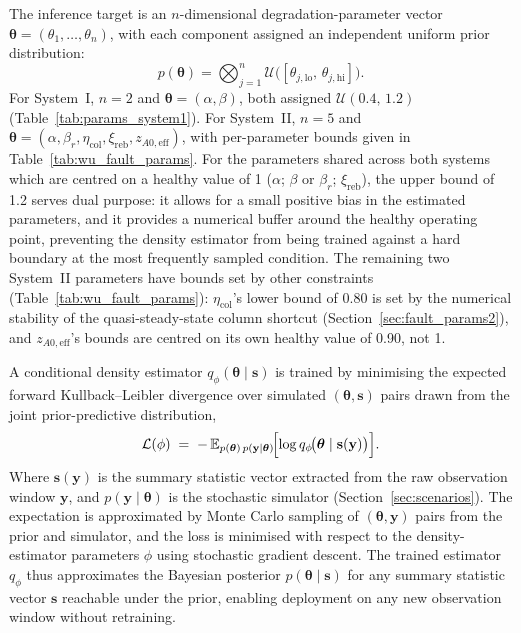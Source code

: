 \documentclass[aps,pre,twocolumn,superscriptaddress]{revtex4-2}
\begin{document}
The inference target is an $n$-dimensional degradation-parameter vector $\boldsymbol{\theta}=(\theta_1,\ldots,\theta_n)$, with each component
assigned an independent uniform prior distribution:
%
\begin{equation}
  p(\boldsymbol{\theta}) =
  \bigotimes_{j=1}^{n}
  \mathcal{U}\!\bigl([\theta_{j,\mathrm{lo}},\,\theta_{j,\mathrm{hi}}]\bigr).
  \label{eq:prior}
\end{equation}
%
For System~I, $n=2$ and $\boldsymbol{\theta}=(\alpha,\beta)$, both assigned
$\mathcal{U}(0.4,\,1.2)$ (Table~\ref{tab:params_system1}). For System~II,
$n=5$ and
$\boldsymbol{\theta}=(\alpha,\beta_r,\eta_\mathrm{col},\xi_\mathrm{reb},z_{A0,\mathrm{eff}})$,
with per-parameter bounds given in Table~\ref{tab:wu_fault_params}.
For the parameters shared across both systems which are centred on a healthy value of 1 ($\alpha$; $\beta$ or $\beta_r$; $\xi_\mathrm{reb}$), the upper bound of 1.2 serves dual purpose: it allows for a small positive bias in the estimated parameters, and it provides a numerical buffer around the healthy operating point, preventing the density estimator from being trained against a hard boundary at the most frequently sampled condition. The remaining two System~II parameters have bounds set by other constraints (Table~\ref{tab:wu_fault_params}): $\eta_\mathrm{col}$'s lower bound of 0.80 is set by the numerical stability of the quasi-steady-state column shortcut (Section~\ref{sec:fault_params2}), and $z_{A0,\mathrm{eff}}$'s bounds are centred on its own healthy value of 0.90, not 1.

A conditional density estimator $q_\phi(\boldsymbol{\theta}\mid\mathbf{s})$ is trained by minimising the expected forward Kullback--Leibler divergence over simulated $(\boldsymbol{\theta},\mathbf{s})$ pairs drawn from the joint prior-predictive distribution,
%
\begin{equation}
  \mathcal{L}(\phi)
  \;=\;
  -\,\mathbb{E}_{p(\boldsymbol{\theta})\,p(\mathbf{y}\mid\boldsymbol{\theta})}
  \!\Bigl[
    \log q_\phi\!\bigl(\boldsymbol{\theta}\mid\mathbf{s}(\mathbf{y})\bigr)
  \Bigr].
  \label{eq:snpe_loss}
\end{equation}
%
Where $\mathbf{s}(\mathbf{y})$ is the summary statistic vector extracted from the raw observation window $\mathbf{y}$, and $p(\mathbf{y}\mid\boldsymbol{\theta})$ 
is the stochastic simulator (Section~\ref{sec:scenarios}). The expectation is approximated by Monte Carlo sampling of $(\boldsymbol{\theta},\mathbf{y})$ pairs from the prior and simulator, and the loss is minimised with respect to the density-estimator parameters $\phi$ using stochastic gradient descent. The trained estimator $q_\phi$ thus approximates the Bayesian posterior $p(\boldsymbol{\theta}\mid\mathbf{s})$ for any summary statistic vector $\mathbf{s}$ reachable under the prior, enabling
deployment on any new observation window without retraining.
\end{document}
